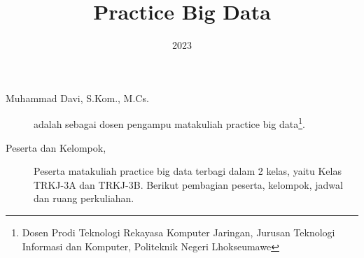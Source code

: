 \documentclass[a4paper]{tufte-handout}
\title{Practice Big Data}
\date{2023}
\begin{document}
\maketitle


\begin{projects}
\begin{description}
\item [Muhammad Davi, S.Kom., M.Cs.] adalah sebagai dosen pengampu matakuliah practice big data\footnote{Dosen Prodi Teknologi Rekayasa Komputer Jaringan, Jurusan Teknologi Informasi dan Komputer, Politeknik Negeri Lhokseumawe}.
\item [Peserta dan Kelompok,] Peserta matakuliah practice big data terbagi dalam 2 kelas, yaitu Kelas TRKJ-3A dan TRKJ-3B. Berikut pembagian peserta, kelompok, jadwal dan ruang perkuliahan.


\end{description}
\end{projects}
\end{document}
